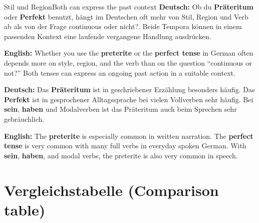 \documentclass[a4paper,11pt]{article}
\newcommand{\GermanText}[1]{\textbf{Deutsch: }#1\par}
\newcommand{\EnglishText}[1]{{\small\color{SoftGray}\textbf{English: }#1\par}}
\begin{document}
        \begin{grammarentry}{Stil und Region}{Both can express the past context}
            \GermanText{Ob du \textbf{Präteritum} oder \textbf{Perfekt} benutzt, hängt im Deutschen oft mehr von Stil, Region und Verb ab als von der Frage \glqq continuous oder nicht?\grqq. Beide Tempora können in einem passenden Kontext eine laufende vergangene Handlung ausdrücken.}
            \EnglishText{Whether you use the \textbf{preterite} or the \textbf{perfect tense} in German often depends more on style, region, and the verb than on the question ``continuous or not?'' Both tenses can express an ongoing past action in a suitable context.}

            \GermanText{Das \textbf{Präteritum} ist in geschriebener Erzählung besonders häufig. Das \textbf{Perfekt} ist in gesprochener Alltagssprache bei vielen Vollverben sehr häufig. Bei \textbf{sein}, \textbf{haben} und Modalverben ist das Präteritum auch beim Sprechen sehr gebräuchlich.}
            \EnglishText{The \textbf{preterite} is especially common in written narration. The \textbf{perfect tense} is very common with many full verbs in everyday spoken German. With \textbf{sein}, \textbf{haben}, and modal verbs, the preterite is also very common in speech.}
        \end{grammarentry}

\section{Vergleichstabelle \textnormal{(Comparison table)}}
\end{document}
